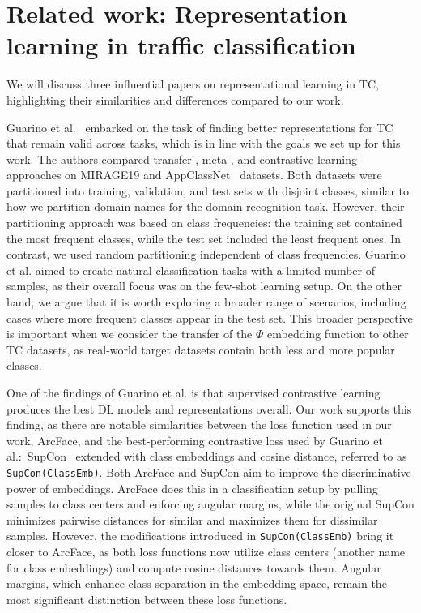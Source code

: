 \section{Related work: Representation learning in traffic classification}
\label{sec:related-work}
We will discuss three influential papers on representational learning in TC, highlighting their similarities and differences compared to our work.

Guarino et al.~\cite{Guarino2023Many} embarked on the task of finding better representations for TC that remain valid across tasks, which is in line with the goals we set up for this work. The authors compared transfer-, meta-, and contrastive-learning approaches on MIRAGE19 and AppClassNet~\cite{Wang2022AppClassNet} datasets. Both datasets were partitioned into training, validation, and test sets with disjoint classes, similar to how we partition domain names for the domain recognition task. However, their partitioning approach was based on class frequencies: the training set contained the most frequent classes, while the test set included the least frequent ones. In contrast, we used random partitioning independent of class frequencies. Guarino et al. aimed to create natural classification tasks with a limited number of samples, as their overall focus was on the few-shot learning setup. On the other hand, we argue that it is worth exploring a broader range of scenarios, including cases where more frequent classes appear in the test set. This broader perspective is important when we consider the transfer of the $\Phi$ embedding function to other TC datasets, as real-world target datasets contain both less and more popular classes.

One of the findings of Guarino et al. is that supervised contrastive learning produces the best DL models and representations overall. Our work supports this finding, as there are notable similarities between the loss function used in our work, ArcFace, and the best-performing contrastive loss used by Guarino et al.:~SupCon~\cite{khosla2020supervised} extended with class embeddings and cosine distance, referred to as \texttt{SupCon(ClassEmb)}. Both ArcFace and SupCon aim to improve the discriminative power of embeddings. ArcFace does this in a classification setup by pulling samples to class centers and enforcing angular margins, while the original SupCon minimizes pairwise distances for similar and maximizes them for dissimilar samples. However, the modifications introduced in \texttt{SupCon(ClassEmb)} bring it closer to ArcFace, as both loss functions now utilize class centers (another name for class embeddings) and compute cosine distances towards them. Angular margins, which enhance class separation in the embedding space, remain the most significant distinction between these loss functions.


